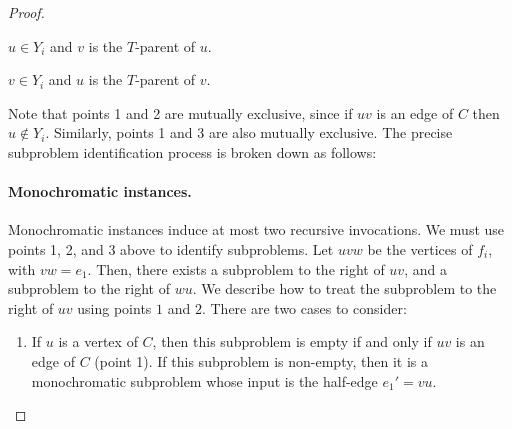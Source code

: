 \documentclass{patmorin}
\begin{document}
\begin{proof}
\begin{compactenum}
 \item $u\in Y_i$ and $v$ is the $T$-parent of $u$.
 
 \item $v\in Y_i$ and $u$ is the $T$-parent of $v$.
 
 
\end{compactenum}
Note that points 1 and 2 are mutually exclusive, since if $uv$ is an edge of $C$ then $u\not\in Y_i$. Similarly, points 1 and 3 are also mutually exclusive.  The precise subproblem identification process is broken down as follows:

\paragraph{Monochromatic instances.} %
Monochromatic instances induce at most two recursive invocations. We must use points 1, 2, and 3 above to identify subproblems. Let $uvw$ be the vertices of $f_i$, with $vw = e_1$. Then, there exists a subproblem to the right of $uv$, and a subproblem to the right of $wu$.  We describe how to treat the subproblem to the right of $uv$ using points $1$ and $2$.  There are two cases to consider: 
\begin{enumerate}
  \item If $u$ is a vertex of $C$, then this subproblem is empty if and only if $uv$ is an edge of $C$ (point 1). If this subproblem is non-empty, then it is a monochromatic subproblem whose input is the half-edge $e_1'=vu$.


\end{enumerate}
\end{proof}
\end{document}

